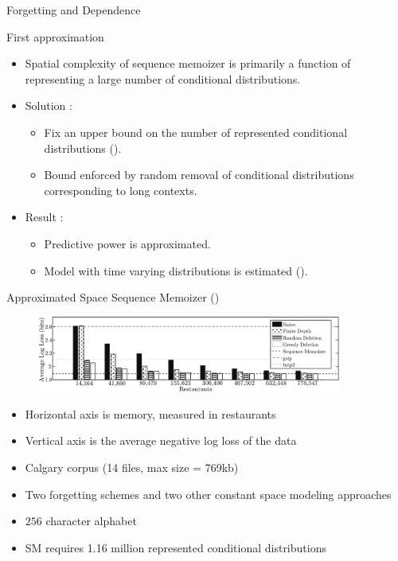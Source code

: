 \documentclass{beamer}
\begin{document}
\begin{frame}[t]{Forgetting and Dependence}
	\begin{block}{First approximation}
		\begin{itemize}
			\item Spatial complexity of sequence memoizer is primarily a function of representing a large number of conditional distributions.
			\item {Solution : \begin{itemize} \item Fix an upper bound on the number of represented conditional distributions (\citet{Bartlett2010}).  
															 \item Bound enforced by random removal of conditional distributions corresponding to long contexts.
								     \end{itemize}
					 }
			\item {Result : \begin{itemize} \item Predictive power is approximated.
														 \item Model with time varying distributions is estimated (\cite{Bartlett2010}).
								  \end{itemize}
					}
		\end{itemize}
	\end{block}	
\end{frame}

\begin{frame}[t]{Approximated Space Sequence Memoizer (\citet{Bartlett2010})}
	\begin{figure}[t]
		\begin{center}
			\includegraphics[width=10cm]{../../../papers/2010_icml/bounded_memory_compression/results_calgary_corpus.pdf}
		\end{center}
	\end{figure}
	
	\begin{itemize}
		\item Horizontal axis is memory, measured in restaurants
		\item Vertical axis is the average negative log loss of the data	
		\item Calgary corpus (14 files, max size = 769kb)
		\item Two forgetting schemes and two other constant space modeling approaches
		\item $256$ character alphabet
		\item SM requires 1.16 million represented conditional distributions
	\end{itemize}
\end{frame}
\end{document}
